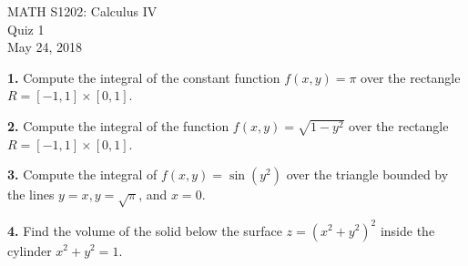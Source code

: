 \documentclass{article}
\theoremstyle{remark}
\begin{document}
\begin{center}
MATH S1202: Calculus IV \\ 
Quiz 1 \\
May 24, 2018
\end{center}

\noindent \textbf{1.} Compute the integral of the constant function $f(x,y) = \pi$ over the rectangle $R = [-1,1] \times [0,1]$. 

\medskip 

\noindent \textbf{2.} Compute the integral of the function $f(x,y) = \sqrt{1-y^2}$ over the rectangle $R = [-1,1] \times [0,1]$. 

\medskip

\noindent \textbf{3.} Compute the integral of $f(x,y) = \sin(y^2)$ over the triangle bounded by the lines $y = x, y=\sqrt{\pi}$, and $x = 0$. 

\medskip 

\noindent \textbf{4.} Find the volume of the solid below the surface $z = (x^2 + y^2)^2$ inside the cylinder $x^2 + y^2 = 1$.  
\end{document}
